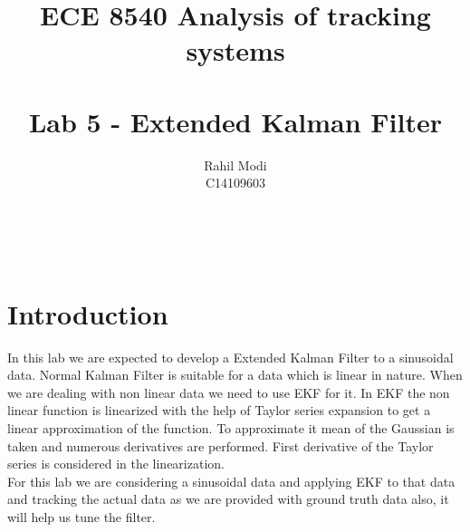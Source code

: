 \documentclass[12pt]{article}
\begin{document}

\title{\Huge{\bf ECE 8540 Analysis of tracking systems}\\ 
\\ 
\huge Lab 5 - Extended Kalman Filter}\\
\author{\LARGE Rahil Modi\\
C14109603}
\maketitle
\clearpage
\section{Introduction}
In this lab we are expected to develop a Extended Kalman Filter to a sinusoidal data. Normal Kalman Filter is suitable for a data which is linear in nature. When we are dealing with non linear data we need to use EKF for it. In EKF the non linear function is linearized with the help of Taylor series expansion to get a linear approximation of the function. To approximate it mean of the Gaussian is taken and numerous derivatives are performed. First derivative of the Taylor series is considered in the linearization.\\
For this lab we are considering a sinusoidal data and applying EKF to that data and tracking the actual data as we are provided with ground truth data also, it will help us tune the filter.
\end{document}
